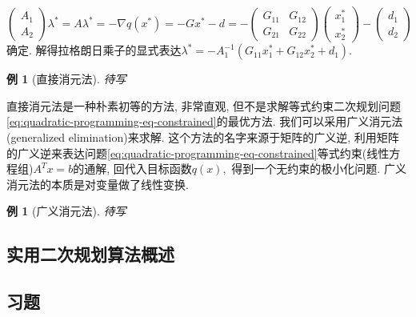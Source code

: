 \documentclass{SBCbookchapter}
\newtheorem{eg}[thm]{例}
\begin{document}
\begin{equation*}
\begin{pmatrix} A_1 \\ A_2 \end{pmatrix} \lambda^* = A \lambda^* = -\nabla q(x^*) = - G x^* - d = - \begin{pmatrix} G_{11} & G_{12} \\ G_{21} & G_{22} \end{pmatrix} \begin{pmatrix} x_1^* \\ x_2^* \end{pmatrix} - \begin{pmatrix} d_1 \\ d_2 \end{pmatrix}
\end{equation*}
确定. 解得拉格朗日乘子的显式表达$\lambda^* = -A_1^{-1} \left( G_{11}x_1^* + G_{12}x_2^* + d_1 \right).$

\begin{eg}[直接消元法]
\label{eg:7.2.1}
待写
\end{eg}

直接消元法是一种朴素初等的方法, 非常直观, 但不是求解等式约束二次规划问题\eqref{eq:quadratic-programming-eq-constrained}的最优方法. 我们可以采用广义消元法(generalized elimination)来求解. 这个方法的名字来源于矩阵的广义逆, 利用矩阵的广义逆来表达问题\eqref{eq:quadratic-programming-eq-constrained}等式约束(线性方程组)$A^Tx = b$的通解, 回代入目标函数$q(x),$ 得到一个无约束的极小化问题. 广义消元法的本质是对变量做了线性变换.

\begin{eg}[广义消元法]
\label{eg:7.2.2}
待写
\end{eg}


\subsection{实用二次规划算法概述}
\label{subsec:7.2.2}

\subsection*{习题}



\end{document}

